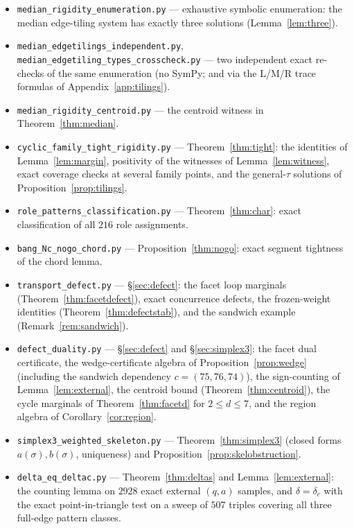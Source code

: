 \documentclass{aims}
\numberwithin{equation}{section}
\theoremstyle{plain}
\theoremstyle{definition}
\theoremstyle{remark}
\begin{document}
\begin{itemize}
\item\texttt{median\_rigidity\_enumeration.py} --- exhaustive symbolic
enumeration: the median edge-tiling system has exactly three solutions
(Lemma~\ref{lem:three}).
\item\texttt{median\_edgetilings\_independent.py},
\texttt{median\_edgetiling\_types\_crosscheck.py} --- two independent exact
re-checks of the same enumeration (no SymPy; and via the L/M/R trace
formulas of Appendix~\ref{app:tilings}).
\item\texttt{median\_rigidity\_centroid.py} --- the centroid witness in
Theorem~\ref{thm:median}.
\item\texttt{cyclic\_family\_tight\_rigidity.py} --- Theorem~\ref{thm:tight}:
the identities of Lemma~\ref{lem:margin}, positivity of the witnesses of
Lemma~\ref{lem:witness}, exact coverage checks at several family points, and
the general-$\tau$ solutions of Proposition~\ref{prop:tilings}.
\item\texttt{role\_patterns\_classification.py} --- Theorem~\ref{thm:char}:
exact classification of all $216$ role assignments.
\item\texttt{bang\_Nc\_nogo\_chord.py} --- Proposition~\ref{thm:nogo}: exact
segment tightness of the chord lemma.
\item\texttt{transport\_defect.py} --- \S\ref{sec:defect}: the facet loop
marginals (Theorem~\ref{thm:facetdefect}), exact concurrence defects, the
frozen-weight identities (Theorem~\ref{thm:defectstab}), and the sandwich
example (Remark~\ref{rem:sandwich}).
\item\texttt{defect\_duality.py} --- \S\ref{sec:defect} and
\S\ref{sec:simplex3}: the facet dual certificate, the wedge-certificate
algebra of Proposition~\ref{prop:wedge} (including the sandwich dependency
$c=(75,76,74)$), the sign-counting of Lemma~\ref{lem:external}, the centroid
bound (Theorem~\ref{thm:centroid}), the cycle marginals of
Theorem~\ref{thm:facetd} for $2\le d\le7$, and the region algebra of
Corollary~\ref{cor:region}.
\item\texttt{simplex3\_weighted\_skeleton.py} --- Theorem~\ref{thm:simplex3}
(closed forms $a(\sigma),b(\sigma)$, uniqueness) and
Proposition~\ref{prop:skelobstruction}.
\item\texttt{delta\_eq\_deltac.py} --- Theorem~\ref{thm:deltas} and
Lemma~\ref{lem:external}: the counting lemma on $2928$ exact external
$(q,a)$ samples, and $\delta=\delta_c$ with the exact point-in-triangle test
on a sweep of $507$ triples covering all three full-edge pattern classes.

\end{itemize}
\end{document}
